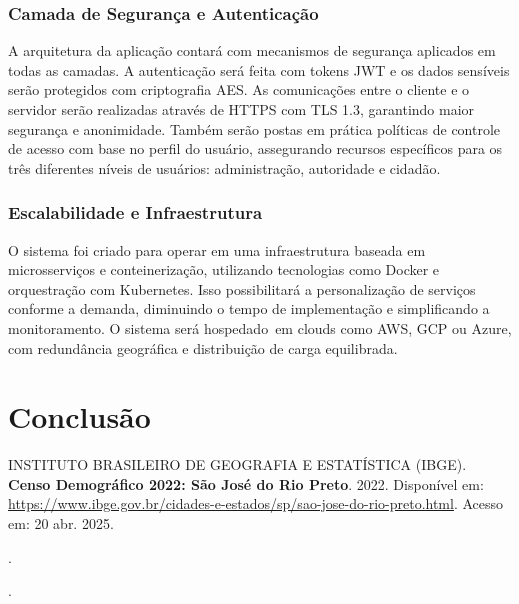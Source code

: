 \documentclass[a5paper, 12pt]{article}
\begin{document}
\subsubsection{Camada de Segurança e Autenticação}

A arquitetura da aplicação contará com mecanismos de segurança aplicados em todas as camadas. A autenticação será feita com tokens JWT e os dados sensíveis serão protegidos com criptografia AES. As comunicações entre o cliente e o servidor serão realizadas através de HTTPS com TLS 1.3, garantindo maior segurança e anonimidade. Também serão postas em prática políticas de controle de acesso com base no perfil do usuário, assegurando recursos específicos para os três diferentes níveis de usuários: administração, autoridade e cidadão.

\subsubsection{Escalabilidade e Infraestrutura}

O sistema foi criado para operar em uma infraestrutura baseada em microsserviços e conteinerização, utilizando tecnologias como Docker e orquestração com Kubernetes.  Isso possibilitará a personalização de serviços conforme a demanda, diminuindo o tempo de implementação e simplificando a monitoramento.  O sistema será hospedado em clouds como AWS, GCP ou Azure, com redundância geográfica e distribuição de carga equilibrada.

\newpage
\section{Conclusão}

\newpage
\renewcommand{\refname}{Bibliografia}
\begin{thebibliography}{09}
 INSTITUTO BRASILEIRO DE GEOGRAFIA E ESTATÍSTICA (IBGE). 
\textbf{Censo Demográfico 2022: São José do Rio Preto}. 
2022. 
Disponível em: \url{https://www.ibge.gov.br/cidades-e-estados/sp/sao-jose-do-rio-preto.html}. 
Acesso em: 20 abr. 2025.

\bibitem{} %
\textbf{}. %

\bibitem{} %
\textbf{}. %

\end{thebibliography}
\end{document}
